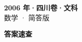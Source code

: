\documentclass[zihao=-4, a4paper]{ctexart}
\begin{document}
\begin{center}
  {\Large\bfseries 2006 年·四川卷·文科}\\[4pt]
  {\large 数学 · 简答版}
\end{center}
\medskip
{}

\clearpage
{}
\begin{center}{\Large\bfseries 答案速查}\end{center}
\medskip

\end{document}
